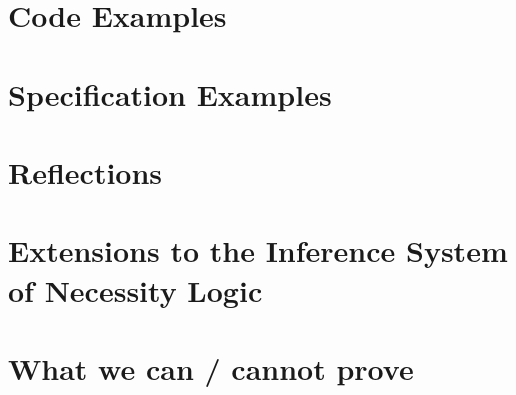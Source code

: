 \documentclass[11pt]{article} %
\theoremstyle{definition}
\begin{document}
\section{Code Examples}


\section{Specification Examples}


\section{Reflections}


\section{Extensions to the Inference System of Necessity Logic}


\section{What we can / cannot prove}

\end{document}
